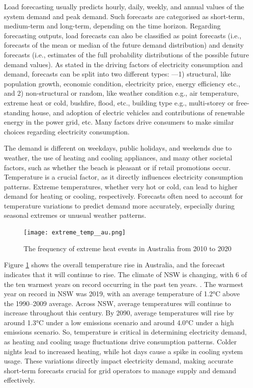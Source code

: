 \documentclass[mstat,12pt]{unswthesis}
\begin{document}
Load forecasting usually predicts hourly, daily, weekly, and annual
values of the system demand and peak demand. Such forecasts are
categorised as short-term, medium-term and long-term, depending on the
time horizon. Regarding forecasting outputs, load forecasts can also be
classified as point forecasts (i.e., forecasts of the mean or median of
the future demand distribution) and density forecasts (i.e., estimates
of the full probability distributions of the possible future demand
values). As stated in \cite{nsw_epa_2021_energy_consumption} the driving
factors of electricity consumption and demand, forecasts can be split
into two different types: ---1) structural, like population growth,
economic condition, electricity price, energy efficiency etc., and 2)
non-structural or random, like weather condition e.g., air temperature,
extreme heat or cold, bushfire, flood, etc., building type e.g.,
multi-storey or free-standing house, and adoption of electric vehicles
and contributions of renewable energy in the power grid, etc. Many
factors drive consumers to make similar choices regarding electricity
consumption.

The demand is different on weekdays, public holidays, and weekends due
to weather, the use of heating and cooling appliances, and many other
societal factors, such as whether the beach is pleasant or if retail
promotions occur. Temperature is a crucial factor, as it directly
influences electricity consumption patterns. Extreme temperatures,
whether very hot or cold, can lead to higher demand for heating or
cooling, respectively. Forecasts often need to account for temperature
variations to predict demand more accurately, especially during seasonal
extremes or unusual weather patterns.

\begin{figure}[H]
\centering
\texttt{[image: extreme\_temp\_\_au.png]}
\caption{The frequency of extreme heat events in Australia from 2010 to 2020}\label{extreme}
\end{figure}

Figure \ref{extreme} shows the overall temperature rise in Australia,
and the forecast indicates that it will continue to rise. The climate of
NSW is changing, with 6 of the ten warmest years on record occurring in
the past ten years. \cite{nswAdaptNSW}. The warmest year on record in
NSW was 2019, with an average temperature of 1.2°C above the 1990--2009
average. Across NSW, average temperatures will continue to increase
throughout this century. By 2090, average temperatures will rise by
around 1.3°C under a low emissions scenario and around 4.0°C under a
high emissions scenario. So, temperature is critical in determining
electricity demand, as heating and cooling usage fluctuations drive
consumption patterns. Colder nights lead to increased heating, while hot
days cause a spike in cooling system usage. These variations directly
impact electricity demand, making accurate short-term forecasts crucial
for grid operators to manage supply and demand effectively.
\end{document}
